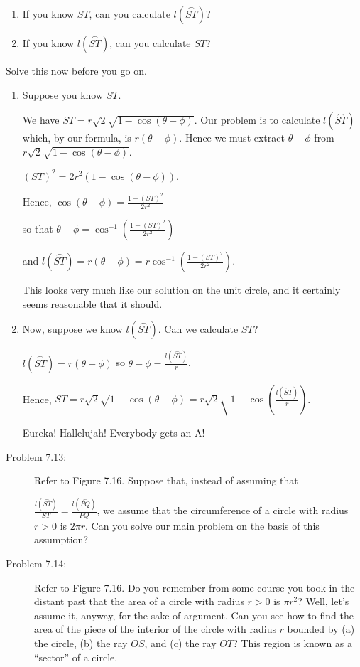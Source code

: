 \documentclass[english]{book}
\newcommand{\arc}[1]{\overset{\frown}{#1} }
\begin{document}
\begin{enumerate}[\hspace{1cm}1)]
  \item If you know $ST$, can you calculate $l(\arc{ST})$?
  \item If you know $l(\arc{ST})$, can you calculate $ST$?
\end{enumerate}

Solve this now before you go on.

\begin{enumerate}[\hspace{1cm}1)]
  \item Suppose you know $ST$.

        We have $ST = r \sqrt{2} \sqrt{ 1 - \cos (\theta-\phi) }$. Our problem is to calculate $l(\arc{ST})$ which, by our formula, is $r(\theta-\phi)$. Hence we must extract $\theta - \phi$ from $r \sqrt{2} \sqrt{ 1 - \cos (\theta-\phi) }$.

        $(ST)^{2} = 2r^{2} (1 - \cos (\theta-\phi) )$.

        Hence, $\cos (\theta-\phi) = \frac{ 1-(ST)^{2} }{ 2r^{2} }$

        so that $\theta - \phi = \cos^{-1} ( \frac{ 1-(ST)^{2} }{ 2r^{2} } )$ 

        and $l(\arc{ST}) = r(\theta-\phi) = r \cos^{-1} ( \frac{ 1-(ST)^{2} }{ 2r^{2} } )$.

        This looks very much like our solution on the unit circle, and it certainly seems reasonable that it should.

  \item Now, suppose we know $l(\arc{ST})$. Can we calculate $ST$?

        $l(\arc{ST}) = r (\theta-\phi)$ so $\theta - \phi = \frac{ l(\arc{ST}) }{ r }$.

        Hence, $ST = r \sqrt{2} \sqrt{1 - \cos (\theta-\phi)} = r \sqrt{2} \sqrt{ 1 -\cos ( \frac{ l(\arc{ST}) }{ r } ) }$.

        Eureka! Hallelujah! Everybody gets an A!
\end{enumerate}

\begin{description}

\item[Problem 7.13:] Refer to Figure 7.16. Suppose that, instead of assuming that

  $\frac{ l(\arc{ST}) }{ST} = \frac{ l(\arc{PQ}) }{PQ}$, we assume that the circumference of a circle with radius $r>0$ is $2 \pi r$. Can you solve our main problem on the basis of this assumption?

\item[Problem 7.14:] Refer to Figure 7.16. Do you remember from some course you took in the distant past that the area of a circle with radius $r>0$ is $\pi r^{2}$? Well, let's assume it, anyway, for the sake of argument. Can you see how to find the area of the piece of the interior of the circle with radius $r$ bounded by (a) the circle, (b) the ray $OS$, and (c) the ray $OT$? This region is known as a ``sector'' of a circle.

\end{description}
\end{document}
